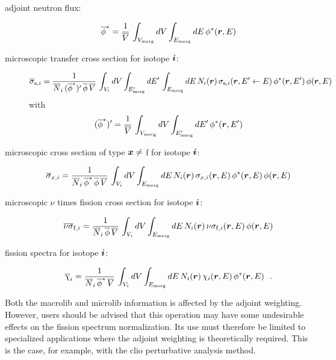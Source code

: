 \begin{description}

\item[adjoint neutron flux:]
$$
\overline\phi^* = {1\over \overline V} \, \int_{V_{\rm merg}} dV \int_{E_{\rm merg}} dE \, \phi^*(\bff(r),E)
$$

\item[microscopic transfer cross section for isotope $\bff(i)$:]
$$
\overline \sigma_{{\rm s},i} ={ 1 \over \overline N_i\, (\overline\phi^*)' \, \overline\phi \, \overline V} \, \int_{V_i} dV \int_{E'_{\rm merg}} dE' \,\int_{E_{\rm merg}} dE \, N_i(\bff(r)) \, \sigma_{{\rm s},i}(\bff(r),E' \leftarrow E) \, \phi^*(\bff(r),E') \, \phi(\bff(r),E)
$$
\noindent with
$$
(\overline\phi^*)' = {1\over \overline V} \, \int_{V_{\rm merg}} dV \int_{E'_{\rm merg}} dE' \, \phi^*(\bff(r),E')
$$

\item[microscopic cross section of type $\bff(x)\neq$ f for isotope $\bff(i)$:]
$$
\overline \sigma_{x,i} ={ 1 \over \overline N_i\, \overline\phi^* \, \overline\phi \, \overline V} \, \int_{V_i} dV \int_{E_{\rm merg}} dE \, N_i(\bff(r)) \, \sigma_{x,i}(\bff(r),E) \, \phi^*(\bff(r),E) \, \phi(\bff(r),E)
$$

\item[microscopic $\nu$ times fission cross section for isotope $\bff(i)$:]
$$
\overline\nu\overline\sigma_{{\rm f},i} ={ 1 \over \overline N_i\, \overline\phi \, \overline V} \, \int_{V_i} dV \int_{E_{\rm merg}} dE \, N_i(\bff(r)) \, \nu\sigma_{{\rm f},i}(\bff(r),E) \, \phi(\bff(r),E)
$$

\item[fission spectra for isotope $\bff(i)$:]
$$
\overline\chi_{i} ={ 1 \over \overline N_i\, \overline\phi^* \, \overline V} \, \int_{V_i} dV \int_{E_{\rm merg}} dE \, N_i(\bff(r)) \, \chi_{i}(\bff(r),E) \, \phi^*(\bff(r),E) \ \ .
$$
\end{description}

Both the macrolib and microlib information is affected by the adjoint weighting. However, users should be advised that this operation may have some
undesirable effects on the fission spectrum normalization. Its use must therefore be limited to specialized applications where the adjoint weighting
is theoretically required. This is the case, for example, with the {\sc clio} perturbative analysis method.\cite{clio}

\eject
